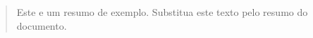 \begin{titlepage}
  \centering
  {\large \InstituicaoDocumento\par}
  \vspace{0.5cm}
  {\large \CursoDocumento\par}
  \vfill
  {\Large \AutorDocumento\par}
  \vfill
  {\bfseries\Large \TituloDocumento\par}
  \vspace{0.3cm}
  {\large \SubtituloDocumento\par}
  \vfill
  {\large \CidadeDocumento\par}
  {\large \AnoDocumento\par}
\end{titlepage}

\begin{abstract}
Este e um resumo de exemplo. Substitua este texto pelo resumo do documento.
\end{abstract}

\clearpage

